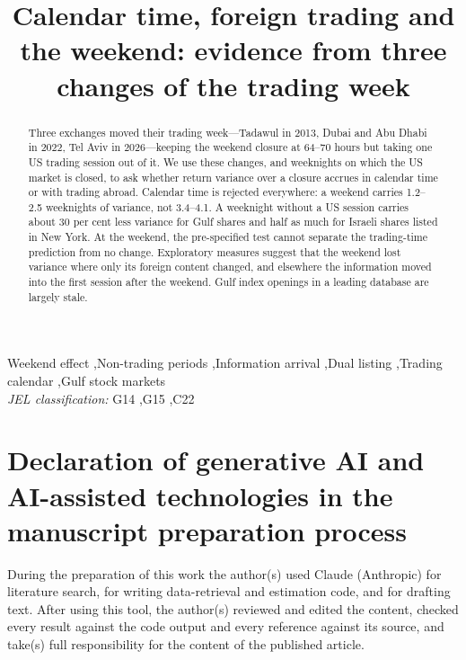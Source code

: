 \documentclass[preprint,12pt]{elsarticle}
\begin{document}
\begin{frontmatter}
\title{Calendar time, foreign trading and the weekend: evidence from three changes of the trading week}

\begin{abstract}
Three exchanges moved their trading week---Tadawul in 2013, Dubai and Abu Dhabi in 2022, Tel Aviv in 2026---keeping the weekend closure at 64--70 hours but taking one US trading session out of it. We use these changes, and weeknights on which the US market is closed, to ask whether return variance over a closure accrues in calendar time or with trading abroad. Calendar time is rejected everywhere: a weekend carries 1.2--2.5 weeknights of variance, not 3.4--4.1. A weeknight without a US session carries about 30 per cent less variance for Gulf shares and half as much for Israeli shares listed in New York. At the weekend, the pre-specified test cannot separate the trading-time prediction from no change. Exploratory measures suggest that the weekend lost variance where only its foreign content changed, and elsewhere the information moved into the first session after the weekend. Gulf index openings in a leading database are largely stale.
\end{abstract}

\begin{keyword}
Weekend effect \sep Non-trading periods \sep Information arrival \sep Dual listing \sep Trading calendar \sep Gulf stock markets
\\[4pt] \textit{JEL classification:} G14 \sep G15 \sep C22
\end{keyword}
\end{frontmatter}




\section*{Declaration of generative AI and AI-assisted technologies in the manuscript preparation process}
During the preparation of this work the author(s) used Claude (Anthropic) for literature search, for writing data-retrieval and estimation code, and for drafting text. After using this tool, the author(s) reviewed and edited the content, checked every result against the code output and every reference against its source, and take(s) full responsibility for the content of the published article.
\end{document}
